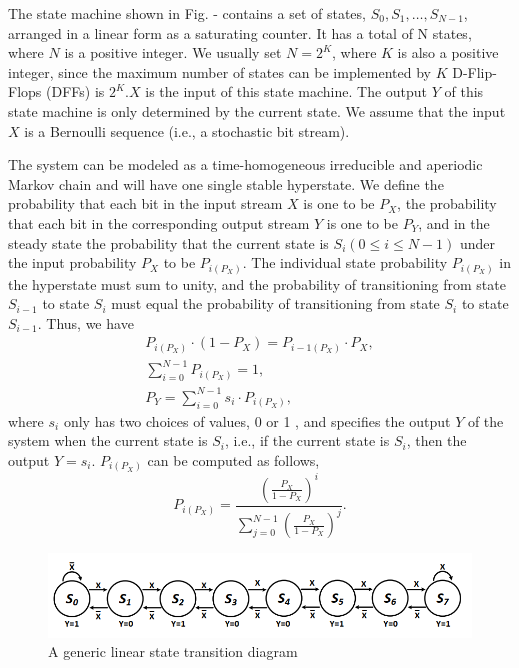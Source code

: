 The state machine shown in Fig. - contains a set of
states, $S_0, S_1, \dots , S_{N-1}$, arranged in a linear form as a saturating counter. It has a total of N states, where $N$ is a positive integer. We usually set $N=2^K$, where $K$ is also a positive integer, since the maximum number of states can be implemented by $K$ D-Flip-Flops (DFFs) is $2^K . X$ is the input of this state machine. The output $Y$ of this state machine is only determined by the current state. We assume that the input $X$ is a Bernoulli sequence (i.e., a stochastic bit stream).

The system can be modeled as a time-homogeneous irreducible and aperiodic Markov chain and will have one single stable hyperstate. We define the probability that each bit in the input stream $X$ is one to be $P_X$, the probability that each bit in the corresponding output stream $Y$ is one to be $P_Y$, and in the steady state the probability that the current state is $S_i(0 \leq i \leq N-1)$ under the input probability $P_X$ to be $P_{i\left(P_X\right)}$. The individual state probability $P_{i\left(P_X\right)}$ in the hyperstate must sum to unity, and the probability of transitioning from state $S_{i-1}$ to state $S_i$ must equal the probability of transitioning from state $S_i$ to state $S_{i-1}$. Thus, we have
$$
\begin{gathered}
P_{i\left(P_X\right)} \cdot\left(1-P_X\right)=P_{i-1\left(P_X\right)} \cdot P_X, \\
\sum_{i=0}^{N-1} P_{i\left(P_X\right)}=1, \\
P_Y=\sum_{i=0}^{N-1} s_i \cdot P_{i\left(P_X\right)},
\end{gathered}
$$
where $s_i$ only has two choices of values, 0 or 1 , and specifies the output $Y$ of the system when the current state is $S_i$, i.e., if the current state is $S_i$, then the output $Y=s_i$. $P_{i\left(P_X\right)}$ can be computed as follows,
$$
P_{i\left(P_X\right)}=\frac{\left(\frac{P_X}{1-P_X}\right)^i}{\sum_{j=0}^{N-1}\left(\frac{P_X}{1-P_X}\right)^j} .
$$


\begin{figure}[htb]
	\includegraphics[width=12cm]{gfx/Generic LSM.png}
	\caption{A generic linear state transition diagram}
	\label{fig:system:example1}
\end{figure}

